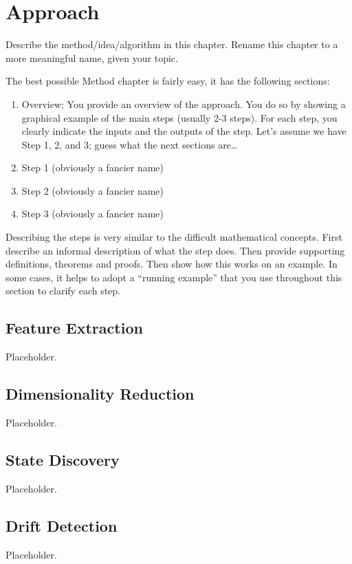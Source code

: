 \chapter{Approach}
\label{chap:method}

Describe the method/idea/algorithm in this chapter.
Rename this chapter to a more meaningful name, given your topic.

The best possible Method chapter is fairly easy, it has the following sections:
\begin{enumerate}
    \item Overview; You provide an overview of the approach. You do so by showing a graphical example of the main steps (usually 2-3 steps).
    For each step, you clearly indicate the inputs and the outputs of the step. Let's assume we have Step 1, 2, and 3; guess what the next sections are\dots
    \item Step 1 (obviously a fancier name)
    \item Step 2 (obviously a fancier name)
    \item Step 3 (obviously a fancier name)
\end{enumerate}
Describing the steps is very similar to the difficult mathematical concepts.
First describe an informal description of what the step does.
Then provide supporting definitions, theorems and proofs.
Then show how this works on an example.
In some cases, it helps to adopt a \enquote{running example} that you use throughout this section to clarify each step.

\section{Feature Extraction}
\label{sec:method:feature_extraction}
Placeholder.

\section{Dimensionality Reduction}
\label{sec:method:dim_reduction}
Placeholder.

\section{State Discovery}
\label{sec:method:state_discovery}
Placeholder.

\section{Drift Detection}
\label{sec:method:drift_detection}
Placeholder.

